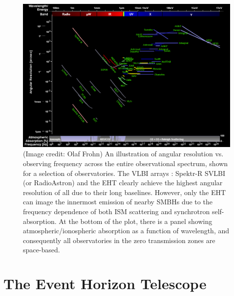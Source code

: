 \begin{figure}[h!]
\includegraphics[width=\columnwidth]{Images/spec_ang}
\caption[An illustration of angular resolution vs. observing frequency across the entire observational spectrum, shown for a selection of observatories. The VLBI arrays : Spektr-R SVLBI (or RadioAstron) and the EHT clearly achieve the highest angular resolution of all due to their long baselines.]{(Image credit: Olaf Frohn\protect\footnotemark[1]) An illustration of angular resolution vs. observing frequency across the entire observational spectrum, shown for a selection of observatories. The VLBI arrays : Spektr-R SVLBI (or RadioAstron) and the EHT clearly achieve the highest angular resolution of all due to their long baselines. However, only the EHT can image the innermost emission of nearby SMBHs due to the frequency dependence of both ISM scattering and synchrotron self-absorption. At the bottom of the plot, there is a panel showing atmospheric/ionospheric absorption as a function of wavelength, and consequently all observatories in the zero transmission zones are space-based. \label{fig:spec_ang}
}
\end{figure}
\section{The Event Horizon Telescope}

